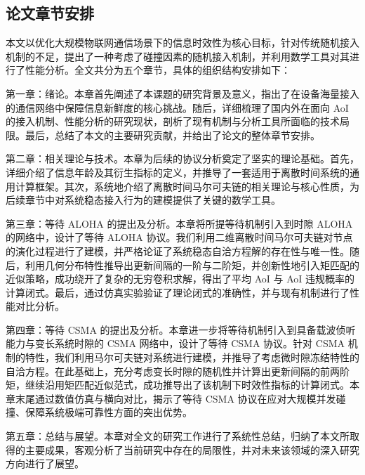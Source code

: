 \subsection{论文章节安排}
本文以优化大规模物联网通信场景下的信息时效性为核心目标，针对传统随机接入机制的不足，提出了一种考虑了碰撞因素的随机接入机制，并利用数学工具对其进行了性能分析。全文共分为五个章节，具体的组织结构安排如下：

第一章：绪论。本章首先阐述了本课题的研究背景及意义，指出了在设备海量接入的通信网络中保障信息新鲜度的核心挑战。随后，详细梳理了国内外在面向 AoI 的接入机制、性能分析的研究现状，剖析了现有机制与分析工具所面临的技术局限。最后，总结了本文的主要研究贡献，并给出了论文的整体章节安排。

第二章：相关理论与技术。本章为后续的协议分析奠定了坚实的理论基础。首先，详细介绍了信息年龄及其衍生指标的定义，并推导了一套适用于离散时间系统的通用计算框架。其次，系统地介绍了离散时间马尔可夫链的相关理论与核心性质，为后续章节中对系统稳态接入行为的建模提供了关键的数学工具。

第三章：等待 ALOHA 的提出及分析。本章将所提等待机制引入到时隙 ALOHA 的网络中，设计了等待 ALOHA 协议。我们利用二维离散时间马尔可夫链对节点的演化过程进行了建模，并严格论证了系统稳态自洽方程解的存在性与唯一性。随后，利用几何分布特性推导出更新间隔的一阶与二阶矩，并创新性地引入矩匹配的近似策略，成功绕开了复杂的无穷卷积求解，得出了平均 AoI 与 AoI 违规概率的计算闭式。最后，通过仿真实验验证了理论闭式的准确性，并与现有机制进行了性能对比分析。

第四章：等待 CSMA 的提出及分析。本章进一步将等待机制引入到具备载波侦听能力与变长系统时隙的 CSMA 网络中，设计了等待 CSMA 协议。针对 CSMA 机制的特性，我们利用马尔可夫链对系统进行建模，并推导了考虑微时隙冻结特性的自洽方程。在此基础上，充分考虑变长时隙的随机性并计算出更新间隔的前两阶矩，继续沿用矩匹配近似范式，成功推导出了该机制下时效性指标的计算闭式。本章末尾通过数值仿真与横向对比，揭示了等待 CSMA 协议在应对大规模并发碰撞、保障系统极端可靠性方面的突出优势。

第五章：总结与展望。本章对全文的研究工作进行了系统性总结，归纳了本文所取得的主要成果，客观分析了当前研究中存在的局限性，并对未来该领域的深入研究方向进行了展望。


